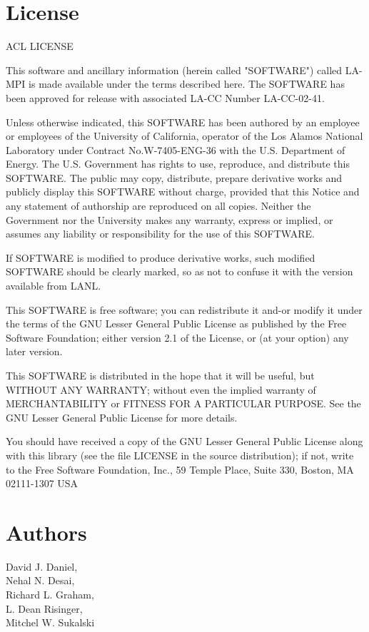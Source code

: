 \documentclass[english]{article}
\begin{document}
\section{License}
\begin{description}

                             ACL LICENSE

This software and ancillary information (herein called "SOFTWARE")
called LA-MPI is made available under the terms described here.  The
SOFTWARE has been approved for release with associated LA-CC Number
LA-CC-02-41.

Unless otherwise indicated, this SOFTWARE has been authored by an
employee or employees of the University of California, operator of the
Los Alamos National Laboratory under Contract No.W-7405-ENG-36 with
the U.S. Department of Energy.  The U.S. Government has rights to use,
reproduce, and distribute this SOFTWARE. The public may copy,
distribute, prepare derivative works and publicly display this
SOFTWARE without charge, provided that this Notice and any statement
of authorship are reproduced on all copies.  Neither the Government
nor the University makes any warranty, express or implied, or assumes
any liability or responsibility for the use of this SOFTWARE.

If SOFTWARE is modified to produce derivative works, such modified
SOFTWARE should be clearly marked, so as not to confuse it with the
version available from LANL.

This SOFTWARE is free software; you can redistribute it and-or modify
it under the terms of the GNU Lesser General Public License as
published by the Free Software Foundation; either version 2.1 of the
License, or (at your option) any later version.

This SOFTWARE is distributed in the hope that it will be useful, but
WITHOUT ANY WARRANTY; without even the implied warranty of
MERCHANTABILITY or FITNESS FOR A PARTICULAR PURPOSE.  See the GNU
Lesser General Public License for more details.

You should have received a copy of the GNU Lesser General Public License along
with this library (see the file LICENSE in the source distribution); if not,
write to the Free Software Foundation, Inc., 59 Temple Place, Suite 330,
Boston, MA 02111-1307 USA

\end{description}

\section{Authors}
\noindent
David J. Daniel, \\
Nehal N. Desai, \\
Richard L. Graham, \\
L. Dean Risinger, \\
Mitchel W. Sukalski 

\LatexManEnd
\end{document}
